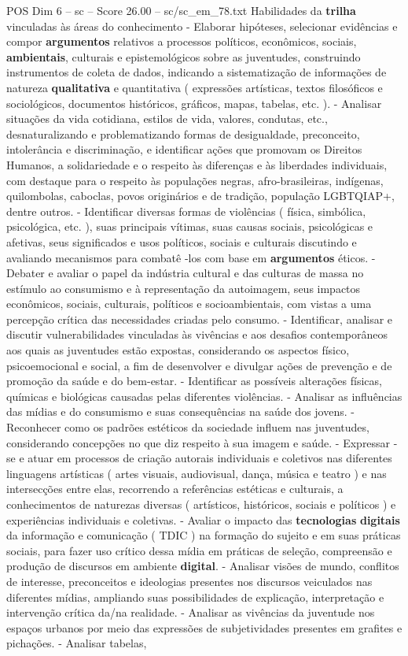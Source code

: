 \begin{textsample}{POS Dim 6 – sc – Score 26.00 – sc/sc\_em\_78.txt}
Habilidades da \textbf{trilha} vinculadas às áreas do conhecimento - Elaborar hipóteses, selecionar evidências e compor \textbf{argumentos} relativos a processos políticos, econômicos, sociais, \textbf{ambientais}, culturais e epistemológicos sobre as juventudes, construindo instrumentos de coleta de dados, indicando a sistematização de informações de natureza \textbf{qualitativa} e quantitativa ( expressões artísticas, textos filosóficos e sociológicos, documentos históricos, gráficos, mapas, tabelas, etc. ). - Analisar situações da vida cotidiana, estilos de vida, valores, condutas, etc., desnaturalizando e problematizando formas de desigualdade, preconceito, intolerância e discriminação, e identificar ações que promovam os Direitos Humanos, a solidariedade e o respeito às diferenças e às liberdades individuais, com destaque para o respeito às populações negras, afro-brasileiras, indígenas, quilombolas, caboclas, povos originários e de tradição, população LGBTQIAP+, dentre outros. - Identificar diversas formas de violências ( física, simbólica, psicológica, etc. ), suas principais vítimas, suas causas sociais, psicológicas e afetivas, seus significados e usos políticos, sociais e culturais discutindo e avaliando mecanismos para combatê -los com base em \textbf{argumentos} éticos. - Debater e avaliar o papel da indústria cultural e das culturas de massa no estímulo ao consumismo e à representação da autoimagem, seus impactos econômicos, sociais, culturais, políticos e socioambientais, com vistas a uma percepção crítica das necessidades criadas pelo consumo. - Identificar, analisar e discutir vulnerabilidades vinculadas às vivências e aos desafios contemporâneos aos quais as juventudes estão expostas, considerando os aspectos físico, psicoemocional e social, a fim de desenvolver e divulgar ações de prevenção e de promoção da saúde e do bem-estar. - Identificar as possíveis alterações físicas, químicas e biológicas causadas pelas diferentes violências. - Analisar as influências das mídias e do consumismo e suas consequências na saúde dos jovens. - Reconhecer como os padrões estéticos da sociedade influem nas juventudes, considerando concepções no que diz respeito à sua imagem e saúde. - Expressar -se e atuar em processos de criação autorais individuais e coletivos nas diferentes linguagens artísticas ( artes visuais, audiovisual, dança, música e teatro ) e nas intersecções entre elas, recorrendo a referências estéticas e culturais, a conhecimentos de naturezas diversas ( artísticos, históricos, sociais e políticos ) e experiências individuais e coletivas. - Avaliar o impacto das \textbf{tecnologias} \textbf{digitais} da informação e comunicação ( TDIC ) na formação do sujeito e em suas práticas sociais, para fazer uso crítico dessa mídia em práticas de seleção, compreensão e produção de discursos em ambiente \textbf{digital}. - Analisar visões de mundo, conflitos de interesse, preconceitos e ideologias presentes nos discursos veiculados nas diferentes mídias, ampliando suas possibilidades de explicação, interpretação e intervenção crítica da/na realidade. - Analisar as vivências da juventude nos espaços urbanos por meio das expressões de subjetividades presentes em grafites e pichações. - Analisar tabelas, 
\end{textsample}
